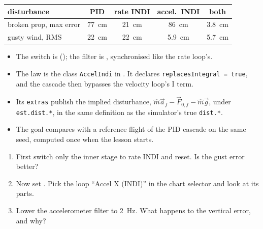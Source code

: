 \begin{center}\small\sffamily
\setlength{\tabcolsep}{4pt}
\begin{tabular}{lcccc}
\toprule
disturbance & PID & rate INDI & accel.\ INDI & both\\
\midrule
broken prop, max error & \SI{77}{cm} & \SI{21}{cm} & \SI{86}{cm} & \SI{3.8}{cm}\\
gusty wind, RMS & \SI{22}{cm} & \SI{22}{cm} & \SI{5.9}{cm} & \SI{5.7}{cm}\\
\bottomrule
\end{tabular}
\end{center}


\begin{inapp}
\begin{itemize}[leftmargin=1.2em]
  \item The switch is  (); the filter is , synchronised like the rate loop's.
  \item The law is the class \texttt{AccelIndi} in . It declares \texttt{replacesIntegral = true}, and the cascade then bypasses the velocity loop's I term.
  \item Its \texttt{extras} publish the implied disturbance, $\hat m\vec a_f - \vec F_{0,f} - \hat m\vec g$, under \texttt{est.dist.*}, in the same definition as the simulator's true \texttt{dist.*}.
  \item The goal compares with a reference flight of the PID cascade on the same seed, computed once when the lesson starts.
\end{itemize}
\end{inapp}

\begin{trythis}
\begin{enumerate}
  \item First switch only the inner stage to rate INDI and reset. Is the gust error better?
  \item Now set . Pick the loop \enquote{Accel X (INDI)} in the chart selector and look at its parts.
  \item Lower the accelerometer filter to \SI{2}{Hz}. What happens to the vertical error, and why?
\end{enumerate}
\end{trythis}

